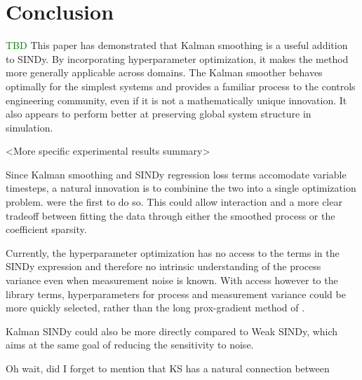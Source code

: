 \documentclass{article}
\newcommand{\green}[1]{\textcolor{green}{#1}}
\begin{document}
\section{Conclusion}
\green{TBD}
This paper has demonstrated that Kalman smoothing is a useful addition to SINDy.  By incorporating hyperparameter optimization, it makes the method more generally applicable across domains. The Kalman smoother behaves optimally for the simplest systems and provides a familiar process to the controls engineering community, even if it is not a mathematically unique innovation.  It also appears to perform better at preserving global system structure in simulation.

<More specific experimental results summary>

Since Kalman smoothing and SINDy regression loss terms accomodate variable timesteps, a natural innovation is to combinine the two into a single optimization problem.  \cite{Hirsh2022} were the first to do so.  This could allow interaction and a more clear tradeoff between fitting the data through either the smoothed process or the coefficient sparsity.

Currently, the hyperparameter optimization has no access to the terms in the SINDy expression and therefore no intrinsic understanding of the process variance even when measurement noise is known.  With access however to the library terms, hyperparameters for process and measurement variance could be more quickly selected, rather than the long prox-gradient method of \cite{Barratt2020}.

Kalman SINDy could also be more directly compared to Weak SINDy, which aims at the same goal of reducing the sensitivity to noise.

Oh wait, did I forget to mention that KS has a natural connection between
\end{document}
